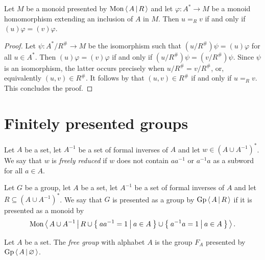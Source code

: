 \begin{lemma}\label{lem:equal_mod_R_is_equal_phi}
	Let $M$ be a monoid presented by $\mathrm{Mon}\left\langle\, A \,\middle|\, R \,\right\rangle$ and let $\varphi: A^\ast\rightarrow M$ be a monoid homomorphism
	extending an inclusion of $A$ in $M$. Then $u=_R v$ if and only if $(u)\varphi = (v)\varphi$.
\end{lemma}
\begin{proof}
	Let $\psi: A^\ast / R^\# \rightarrow M$ be the isomorphism such that $(u/R^\#)\psi = (u)\varphi$ for all
	$u\in A^\ast$. Then $(u)\varphi = (v)\varphi$ if and only if $(u/R^\#)\psi = (v/R^\#)\psi$. Since $\psi$ is an
	isomorphism, the latter occurs precisely when $u/R^\# = v/R^\#$, or, equivalently $(u, v)\in R^\#$. It follows by
	 that $(u, v)\in R^\#$ if and only if $u=_R v$. This concludes the proof.
\end{proof}

\section{Finitely presented groups}

\begin{definition}\label{def:reduced_word}
	Let $A$ be a set, let $A^{-1}$ be a set of formal inverses of $A$ and let $w\in {\left(A\cup A^{-1}\right)}^\ast$.
	We say that $w$ is \emph{freely reduced} if $w$ does not contain $aa^{-1}$ or $a^{-1}a$ as a subword for all $a\in A$.
\end{definition}

\begin{definition}\label{def:group_presentation}
	Let $G$ be a group, let $A$ be a set, let $A^{-1}$ be a set of formal inverses of $A$ and let
	$R\subseteq {\left(A\cup A^{-1}\right)}^\ast$. We say that $G$ is presented as a group by $\mathrm{Gp}\left\langle\, A \,\middle|\, R \,\right\rangle$ if it is
	presented as a monoid by
	\[
		\mathrm{Mon}\left\langle\, A\cup A^{-1} \,\middle|\, R\cup\left\{\: aa^{-1} = 1 \: \middle|\: a\in A \:\right\}\cup\left\{\: a^{-1}a=1 \: \middle|\: a\in A \:\right\} \,\right\rangle.
	\]
\end{definition}

\begin{definition}\label{def:free_group}
	Let $A$ be a set. The \emph{free group} with alphabet $A$ is the group $F_A$ presented by
	$\mathrm{Gp}\left\langle\, A \,\middle|\, \varnothing \,\right\rangle$.
\end{definition}

